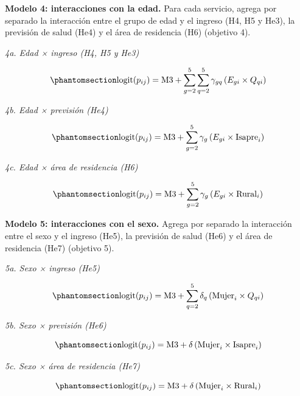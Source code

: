 \documentclass[
  spanish,
  a4paper,
  oneside]{scrbook}
\begin{document}
\textbf{Modelo 4: interacciones con la edad.} Para cada servicio, agrega
por separado la interacción entre el grupo de edad y el ingreso (H4, H5
y He3), la previsión de salud (He4) y el área de residencia (H6)
(objetivo 4).

\emph{4a. Edad × ingreso (H4, H5 y He3)}

\begin{equation}\protect\phantomsection\label{eq-m4a}{
\text{logit}(p_{ij}) = \text{M3} + \sum_{g=2}^{5}\sum_{q=2}^{5}\gamma_{gq}\,(E_{gi}\times Q_{qi})
}\end{equation}

\emph{4b. Edad × previsión (He4)}

\begin{equation}\protect\phantomsection\label{eq-m4b}{
\text{logit}(p_{ij}) = \text{M3} + \sum_{g=2}^{5}\gamma_{g}\,(E_{gi}\times \text{Isapre}_i)
}\end{equation}

\emph{4c. Edad × área de residencia (H6)}

\begin{equation}\protect\phantomsection\label{eq-m4c}{
\text{logit}(p_{ij}) = \text{M3} + \sum_{g=2}^{5}\gamma_{g}\,(E_{gi}\times \text{Rural}_i)
}\end{equation}

\textbf{Modelo 5: interacciones con el sexo.} Agrega por separado la
interacción entre el sexo y el ingreso (He5), la previsión de salud
(He6) y el área de residencia (He7) (objetivo 5).

\emph{5a. Sexo × ingreso (He5)}

\begin{equation}\protect\phantomsection\label{eq-m5a}{
\text{logit}(p_{ij}) = \text{M3} + \sum_{q=2}^{5}\delta_{q}\,(\text{Mujer}_i\times Q_{qi})
}\end{equation}

\emph{5b. Sexo × previsión (He6)}

\begin{equation}\protect\phantomsection\label{eq-m5b}{
\text{logit}(p_{ij}) = \text{M3} + \delta\,(\text{Mujer}_i\times \text{Isapre}_i)
}\end{equation}

\emph{5c. Sexo × área de residencia (He7)}

\begin{equation}\protect\phantomsection\label{eq-m5c}{
\text{logit}(p_{ij}) = \text{M3} + \delta\,(\text{Mujer}_i\times \text{Rural}_i)
}\end{equation}
\end{document}
